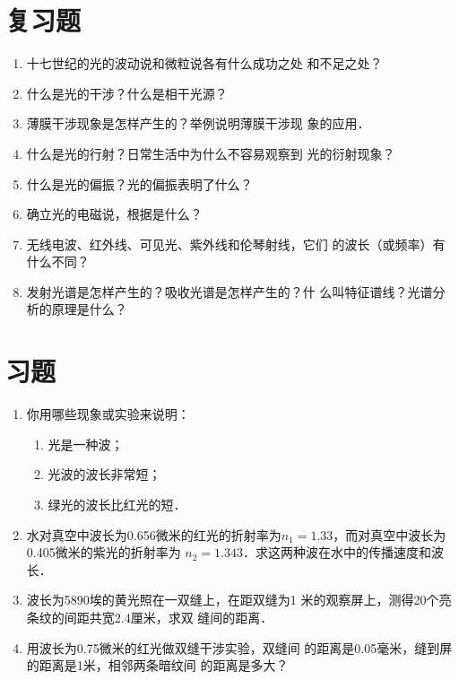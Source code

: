 \section*{复习题}
\begin{enumerate}
\item 十七世纪的光的波动说和微粒说各有什么成功之处
和不足之处？
\item 什么是光的干涉？什么是相干光源？
\item 薄膜干涉现象是怎样产生的？举例说明薄膜干涉现
象的应用．
\item 什么是光的行射？日常生活中为什么不容易观察到
光的衍射现象？
\item 什么是光的偏振？光的偏振表明了什么？
\item 确立光的电磁说，根据是什么？
\item 无线电波、红外线、可见光、紫外线和伦琴射线，它们
的波长（或频率）有什么不同？
\item 发射光谱是怎样产生的？吸收光谱是怎样产生的？什
么叫特征谱线？光谱分析的原理是什么？
\end{enumerate}

\section*{习题}

\begin{enumerate}
    \item 你用哪些现象或实验来说明：
    \begin{enumerate}
        \item 光是一种波；
        \item 光波的波长非常短；
        \item 绿光的波长比红光的短．
    \end{enumerate}
    \item 水对真空中波长为0.656微米的红光的折射率为$n_1
    =1.33$，而对真空中波长为0.405微米的紫光的折射率为
    $n_2=1.343$．求这两种波在水中的传播速度和波长．
    \item 波长为5890埃的黄光照在一双缝上，在距双缝为1
    米的观察屏上，测得20个亮条纹的间距共宽2.4厘米，求双
    缝间的距离．
    \item 用波长为0.75微米的红光做双缝干涉实验，双缝间
    的距离是0.05毫米，缝到屏的距离是1米，相邻两条暗纹间
    的距离是多大？
\end{enumerate}



